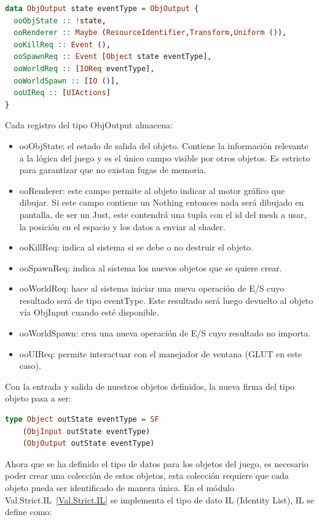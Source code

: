 \begin{lstlisting}[label={ObjOutputDef},frame=single,language=Haskell]
data ObjOutput state eventType = ObjOutput {
  ooObjState :: !state,
  ooRenderer :: Maybe (ResourceIdentifier,Transform,Uniform ()),
  ooKillReq :: Event (),
  ooSpawnReq :: Event [Object state eventType],
  ooWorldReq :: [IOReq eventType],
  ooWorldSpawn :: [IO ()],
  ooUIReq :: [UIActions]
}
\end{lstlisting}

Cada registro del tipo ObjOutput almacena:

\begin{itemize}
\item ooObjState: el estado de salida del objeto. Contiene la información relevante a la lógica del juego y es el único campo visible por otros objetos. Es estricto para garantizar que no existan fugas de memoria.
\item ooRenderer: este campo permite al objeto indicar al motor gráfico que dibujar. Si este campo contiene un Nothing entonces nada será dibujado en pantalla, de ser un Just, este contendrá una tupla con el id del mesh a usar, la posición en el espacio y los datos a enviar al shader.
\item ooKillReq: indica al sistema si se debe o no destruir el objeto.
\item ooSpawnReq: indica al sistema los nuevos objetos que se quiere crear.
\item ooWorldReq: hace al sistema iniciar una nueva operación de E/S cuyo resultado será de tipo eventType. Este resultado será luego devuelto al objeto vía ObjInput cuando esté disponible.
\item ooWorldSpawn: crea una nueva operación de E/S cuyo resultado no importa.
\item ooUIReq: permite interactuar con el manejador de ventana (GLUT en este caso).
\end{itemize}

Con la entrada y salida de nuestros objetos definidos, la nueva firma del tipo objeto pasa a ser:

\begin{lstlisting}[label={ObjDef2},frame=single,language=Haskell]
type Object outState eventType = SF
    (ObjInput outState eventType)
    (ObjOutput outState eventType)
\end{lstlisting}

Ahora que se ha definido el tipo de datos para los objetos del juego, es necesario poder crear una colección de estos objetos, esta colección requiere que cada objeto pueda ser identificado de manera única. En el módulo Val.Strict.IL~\ref{Val.Strict.IL} se implementa el tipo de dato IL (Identity List), IL se define como:

